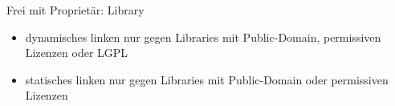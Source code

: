 \begin{frame}{Frei mit Proprietär: Library}
\begin{multicols}{2}
{\begin{center}
			\end{center}
		}
	\end{multicols}
\end{frame}
\note
{
	\begin{itemize}
		\item dynamisches linken nur gegen Libraries mit Public-Domain, permissiven Lizenzen oder LGPL
		\item statisches linken nur gegen Libraries mit Public-Domain oder permissiven Lizenzen
	\end{itemize}
}

